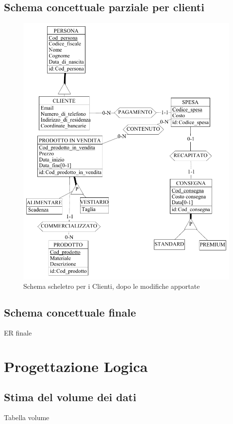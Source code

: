 \documentclass[a4paper,12pt]{report}
\begin{document}
\section{Schema concettuale parziale per clienti}
\begin{figure}[h]
	\centering{}
	\includegraphics[width=\textwidth]{img/SchemaConcettuale-Clienti2.pdf}
	\caption{Schema scheletro per i Clienti, dopo le modifiche apportate}
\end{figure}

\section{Schema concettuale finale}
ER finale

\chapter{Progettazione Logica}
\section{Stima del volume dei dati}
Tabella volume
\end{document}

